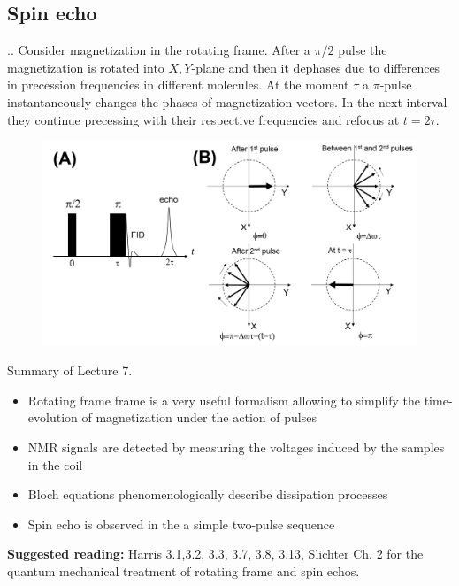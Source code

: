 \documentclass{beamer}
\begin{document}
\subsection{Spin echo}
\begin{frame}{\thesection.\thesubsection. \insertsubsection}
  Consider magnetization in the rotating frame.  After a $\pi/2$ pulse the magnetization is rotated into $X,Y$-plane and then it dephases due to differences in precession frequencies in different molecules. At the moment $\tau$ a $\pi$-pulse instantaneously changes the phases of magnetization vectors. In the next interval they continue precessing with their respective frequencies and refocus at $t = 2 \tau$. 
  \begin{figure}
  	\centering
  	\includegraphics[scale =0.3]{figures/spin_echo.png}
  \end{figure}
\end{frame}

\begin{frame}{Summary of Lecture 7.}
    \begin{itemize}
    	\item Rotating frame frame is a very useful formalism allowing to simplify the time-evolution of magnetization under the action of pulses
    	\item NMR signals are detected by measuring the voltages induced by the samples in the coil
    	\item Bloch equations phenomenologically describe dissipation processes
    	\item Spin echo is observed in the a simple two-pulse sequence
    \end{itemize}

	\textbf{Suggested reading:} Harris 3.1,3.2, 3.3, 3.7, 3.8, 3.13, Slichter Ch. 2 for the quantum mechanical treatment of rotating frame and spin echos.
\end{frame}
\end{document}
